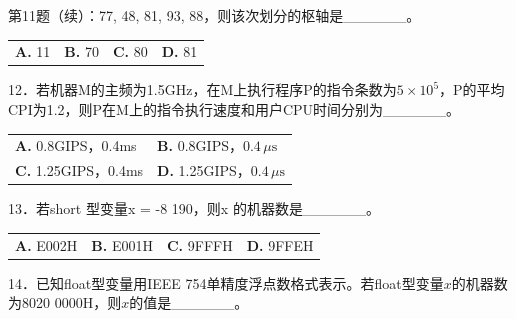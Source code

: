 \documentclass[UTF8,11pt]{ctexart}
\begin{document}
第11题（续）：77, 48, 81, 93, 88，则该次划分的枢轴是\_\_\_\_\_\_。


\begin{center}\begin{tabular}{>{\raggedright\arraybackslash}p{\dimexpr(\linewidth-8\tabcolsep)/4\relax}>{\raggedright\arraybackslash}p{\dimexpr(\linewidth-8\tabcolsep)/4\relax}>{\raggedright\arraybackslash}p{\dimexpr(\linewidth-8\tabcolsep)/4\relax}>{\raggedright\arraybackslash}p{\dimexpr(\linewidth-8\tabcolsep)/4\relax}}
\textbf{A.} 11 & \textbf{B.} 70 & \textbf{C.} 80 & \textbf{D.} 81\\[.35em]\end{tabular}\end{center}

12．若机器M的主频为1.5GHz，在M上执行程序P的指令条数为\(\displaystyle 5\times10^5\)，P的平均CPI为1.2，则P在M上的指令执行速度和用户CPU时间分别为\_\_\_\_\_\_。


\begin{center}\begin{tabular}{>{\raggedright\arraybackslash}p{\dimexpr(\linewidth-4\tabcolsep)/2\relax}>{\raggedright\arraybackslash}p{\dimexpr(\linewidth-4\tabcolsep)/2\relax}}
\textbf{A.} 0.\allowbreak{}8GIPS，0.\allowbreak{}4ms & \textbf{B.} 0.\allowbreak{}8GIPS，\(\displaystyle 0.4\,\mu\mathrm{s}\)\\[.35em]
\textbf{C.} 1.\allowbreak{}25GIPS，0.\allowbreak{}4ms & \textbf{D.} 1.\allowbreak{}25GIPS，\(\displaystyle 0.4\,\mu\mathrm{s}\)\\[.35em]\end{tabular}\end{center}

13．若short 型变量x = -8 190，则x 的机器数是\_\_\_\_\_\_。


\begin{center}\begin{tabular}{>{\raggedright\arraybackslash}p{\dimexpr(\linewidth-8\tabcolsep)/4\relax}>{\raggedright\arraybackslash}p{\dimexpr(\linewidth-8\tabcolsep)/4\relax}>{\raggedright\arraybackslash}p{\dimexpr(\linewidth-8\tabcolsep)/4\relax}>{\raggedright\arraybackslash}p{\dimexpr(\linewidth-8\tabcolsep)/4\relax}}
\textbf{A.} E002H & \textbf{B.} E001H & \textbf{C.} 9FFFH & \textbf{D.} 9FFEH\\[.35em]\end{tabular}\end{center}

14．已知float型变量用IEEE 754单精度浮点数格式表示。若float型变量\(\displaystyle x\)的机器数为8020 0000H，则\(\displaystyle x\)的值是\_\_\_\_\_\_。
\end{document}
